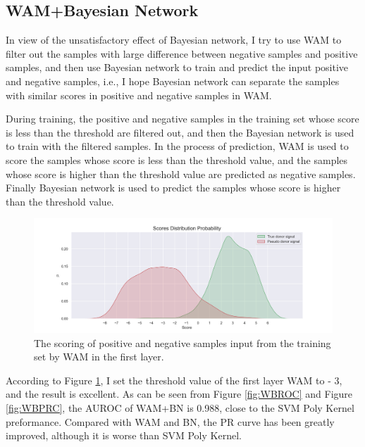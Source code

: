 \documentclass{gapd}
\begin{document}
\subsection{WAM+Bayesian Network}\label{wambayesian-network}

In view of the unsatisfactory effect of Bayesian network, I try to use
WAM to filter out the samples with large difference between negative
samples and positive samples, and then use Bayesian network to train and
predict the input positive and negative samples, i.e., I hope
Bayesian network can separate the samples with similar scores in
positive and negative samples in WAM.


During training, the positive and negative samples in the training set
whose score is less than the threshold are filtered out, and then the
Bayesian network is used to train with the filtered samples. In the
process of prediction, WAM is used to score the samples whose score is
less than the threshold value, and the samples whose score is higher
than the threshold value are predicted as negative samples. Finally
Bayesian network is used to predict the samples whose score is higher
than the threshold value.

\begin{figure}[h]
  \centering
  \includegraphics[width=\columnwidth]{assets/Distribution_Probability.png}
  \caption{The scoring of positive and negative samples input 
  from the training set by WAM in the first layer.}
  \label{fig:WBDistribution}
\end{figure}

According to Figure \ref*{fig:WBDistribution}, I set the threshold value of the first layer WAM to - 3, and the result
is excellent. As can be seen from Figure \ref{fig:WBROC} and Figure \ref{fig:WBPRC}, the AUROC of WAM+BN
is 0.988, close to the SVM Poly Kernel preformance. Compared with WAM
and BN, the PR curve has been greatly improved, although it is worse
than SVM Poly Kernel.
\end{document}
